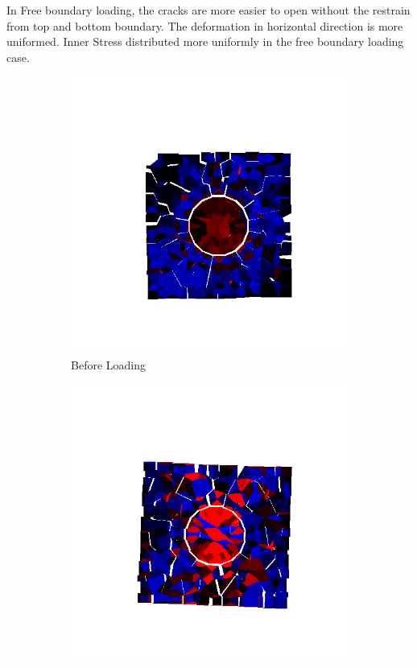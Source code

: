 In Free boundary loading, the cracks are more easier to open without the restrain from top and bottom boundary. The deformation in horizontal direction is more uniformed. Inner Stress distributed more uniformly in the free boundary loading case.

\begin{figure}[ht!]
\centering

    \begin{subfigure}{.33\textwidth}
      \centering
      \includegraphics[width=1.0\linewidth]{Files/Small_ASR/IS2/DEP5-STEP(020).png}
      \caption{Before Loading}
    \end{subfigure}%
    \begin{subfigure}{.33\textwidth}
      \centering
      \includegraphics[width=1.0\linewidth]{Files/Small_ASR/Free_IS2/DEP5-STEP(040).png}

\end{subfigure}
\end{figure}
